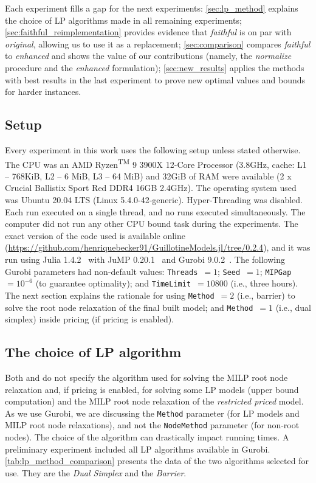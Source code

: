 \documentclass[smallextended]{svjour3}       %
\begin{document}
Each experiment fills a gap for the next experiments:
\autoref{sec:lp_method} explains the choice of LP algorithms made in all remaining experiments;
\autoref{sec:faithful_reimplementation} provides evidence that \emph{faithful} is on par with \emph{original}, allowing us to use it as a replacement;
\autoref{sec:comparison} compares \emph{faithful} to \emph{enhanced} and shows the value of our contributions (namely, the \emph{normalize} procedure and the \emph{enhanced} formulation);
\autoref{sec:new_results} applies the methods with best results in the last experiment to prove new optimal values and bounds for harder instances.

\subsection{Setup}
\label{sec:setup}

Every experiment in this work uses the following setup unless stated otherwise.
The CPU was an AMD\textsuperscript{\textregistered} Ryzen\textsuperscript{TM} 9 3900X 12-Core Processor (3.8GHz, cache: L1 -- 768KiB, L2 -- 6 MiB, L3 -- 64 MiB) and 32GiB of RAM were available (2 x Crucial Ballistix Sport Red DDR4 16GB 2.4GHz).
The operating system used was Ubuntu 20.04 LTS (Linux 5.4.0-42-generic).
Hyper-Threading was disabled.
Each run executed on a single thread, and no runs executed simultaneously.
The computer did not run any other CPU bound task during the experiments.
The exact version of the code used is available online (\url{https://github.com/henriquebecker91/GuillotineModels.jl/tree/0.2.4}), and it was run using Julia 1.4.2~\cite{julia} with JuMP 0.20.1~\cite{JuMP} and Gurobi 9.0.2~\cite{gurobi}.
The following Gurobi parameters had non-default values: \verb+Threads+~\(= 1\); \verb+Seed+~\(= 1\); \verb+MIPGap+~\(= 10^{-6}\) (to guarantee optimality); and \verb+TimeLimit+~\(= 10800\) (i.e., three hours).
The next section explains the rationale for using \verb+Method+~\(= 2\) (i.e., barrier) to solve the root node relaxation of the final built model; and \verb+Method+~\(= 1\) (i.e., dual simplex) inside pricing (if pricing is enabled).

\subsection{The choice of LP algorithm}
\label{sec:lp_method}

Both \cite{furini:2016} and \cite{dimitri_thesis} do not specify the algorithm used for solving the MILP root node relaxation and, if pricing is enabled, for solving some LP models (upper bound computation) and the MILP root node relaxation of the \emph{restricted priced} model.
As we use Gurobi, we are discussing the \verb+Method+ parameter (for LP models and MILP root node relaxations), and not the \verb+NodeMethod+ parameter (for non-root nodes).
The choice of the algorithm can drastically impact running times.
A preliminary experiment included all LP algorithms available in Gurobi.
\autoref{tab:lp_method_comparison} presents the data of the two algorithms selected for use.
They are the \emph{Dual Simplex} and the \emph{Barrier}.
\end{document}
